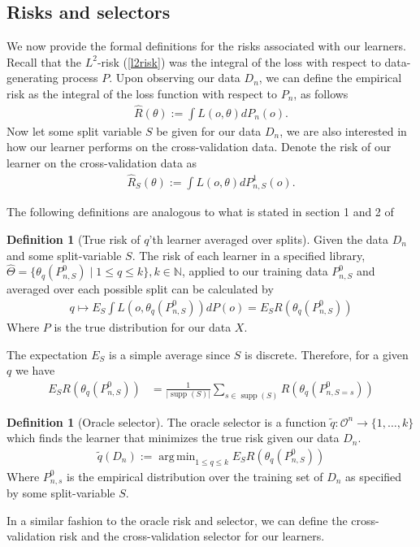 \documentclass[11pt, a4paper]{article}
\DeclareMathOperator*{\argmin}{arg\,min}
\theoremstyle{definition}
\newtheorem{definition}[theorem]{Definition}
\theoremstyle{remark}
\newcommand{\q}{q}
\newcommand{\ml}{k}
\newcommand{\btheta}{\theta}
\begin{document}
\subsection{Risks and selectors}
We now provide the formal definitions for the risks associated with our learners. Recall that the $L^2$-risk (\ref{l2risk}) was the integral of the loss with respect to data-generating process $P$. Upon observing our data $D_n$, we can define the empirical risk as the integral of the loss function with respect to $P_n$, as follows
\begin{align*}
    \hat{R}(\btheta) := \int L(o, \btheta) d P_{n}(o).
\end{align*}
 Now let some split variable $ S $ be given for our data $ D_n $, we are also interested in how our learner performs on the cross-validation data. Denote the risk of our learner on the cross-validation data as 
 \begin{align*}
     \hat{R}_S(\theta) :=  \int L(o, \btheta) d P_{n,S}^{1}(o).
 \end{align*}
 
 The following definitions are analogous to what is stated in section 1 and 2 of  \cite{laan03}
\begin{definition}[True risk of $ \q $'th learner averaged over splits]
    Given the data $ D_n $ and some split-variable $ S $. The risk of each learner in a specified library, $ \hat{\Theta} = \{ \btheta_{\q}(P_{n, S}^{0}) \mid 1 \leq \q \leq \ml \}, \ml \in \mathbb{N} $, applied to our training data $ P_{n, S}^{0} $ and averaged over each possible split can be calculated by
    \begin{align*}
        \q \mapsto E_S \int L(o, \btheta_{\q}(P_{n,S}^{0}) ) dP(o) = E_S R( \btheta_\q(P_{n,S}^{0})) 
    \end{align*}
    Where $ P $ is the true distribution for our data $ X $.
\end{definition}
The expectation $ E_S $ is a simple average since $ S $ is discrete. Therefore, for a given $ \q $ we have 
\begin{align*}
    E_S R( \btheta_\q(P_{n,S}^{0})) &= \frac{1}{| \operatorname{supp}(S)|} \sum_{s \in \operatorname{supp}(S)} R(\theta_{q}(P_{n, S = s}^{0}))
\end{align*}



\begin{definition}[Oracle selector]
    The oracle selector is a function $ \tilde{\q}: \mathcal{O}^{n} \to \{1,\ldots,k\} $  which finds the learner that minimizes the true risk given our data $ D_n $. 
    \begin{align*}
        \tilde{\q}(D_n) := \argmin_{1 \leq \q \leq \ml} E_S R( \btheta _\q (P_{n,S}^0 )) 
    \end{align*}
    Where $ P_{n ,s}^{0} $ is the empirical distribution over the training set of $D_n $ as specified by some split-variable $ S $. 
\end{definition}
In a similar fashion to the oracle risk and selector, we can define the cross-validation risk and the cross-validation selector for our learners.
\end{document}
